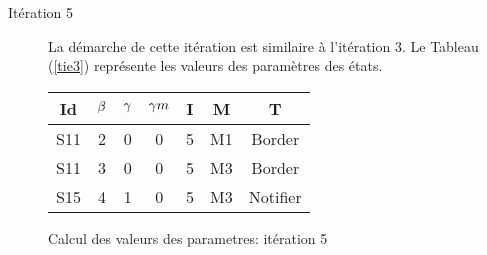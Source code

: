 \begin{Exemple}
\begin{description}
\item[Itération 5] La démarche de cette itération est similaire à l'itération 3. Le Tableau (\ref{tie3}) représente les valeurs des paramètres  des états.
\begin{tableth}
	\centering
	\begin{tabular}{|*{7}{c|}}
		\hline
		Id&$\beta{}$&	$\gamma{}$	&$\gamma m{}$ &	I&	M&	T\\ \hline
		S11&	2&	0&	0&	5&	M1&	Border\\ \hline
		S11&	3&	0&	0&	5&	M3&	Border\\ \hline
		S15&	4&	1&	0&	5&	M3&	Notifier\\ \hline
	\end{tabular}
	\caption{Calcul des valeurs des parametres: itération 5}\label{tie5}
\end{tableth}

\end{description}	
\end{Exemple}